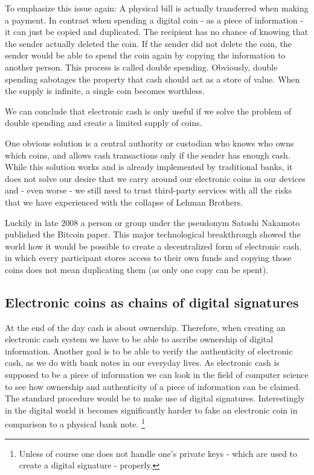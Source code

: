 \documentclass[a4paper,12pt,oneside,openany]{book}
\begin{document}
To emphasize this issue again: A physical bill is actually transferred when making a payment. In contrast when spending a digital coin - as a piece of information - it can just be copied and duplicated.
The recipient has no chance of knowing that the sender actually deleted the coin.
If the sender did not delete the coin, the sender would be able to spend the coin again by copying the information to another person.
This process is called double spending.
Obviously, double spending sabotages the property that cash should act as a store of value. When the supply is infinite, a single coin becomes worthless. 

We can conclude that electronic cash is only useful if we solve the problem of double spending and create a limited supply of coins.

One obvious solution is a central authority or custodian who knows who owns which coins, and allows cash transactions only if the sender has enough cash.
While this solution works and is already implemented by traditional banks, it does not solve our desire that we carry around our electronic coins in our devices and - even worse - we still need to trust third-party services with all the risks that we have experienced with the collapse of Lehman Brothers.

Luckily in late 2008 a person or group under the pseudonym Satoshi Nakamoto published the Bitcoin paper.
This major technological breakthrough showed the world how it would be possible to create a decentralized form of electronic cash.
in which every participant stores access to their own funds and copying those coins does not mean duplicating them (as only one copy can be spent).

\subsection{Electronic coins as chains of digital signatures}
At the end of the day cash is about ownership.
Therefore, when creating an electronic cash system we have to be able to ascribe ownership of digital information. 
Another goal is to be able to verify the authenticity of electronic cash, as we do with bank notes in our everyday lives.
As electronic cash is supposed to be a piece of information we can look in the field of computer science to see how ownership and authenticity of a piece of information can be claimed.
The standard procedure would be to make use of \gls{digital signature}s.
Interestingly in the digital world it becomes significantly harder to fake an electronic coin in comparison to a physical bank note.
\footnote{Unless of course one does not handle one's private keys - which are used to create a digital signature - properly.}
\end{document}
